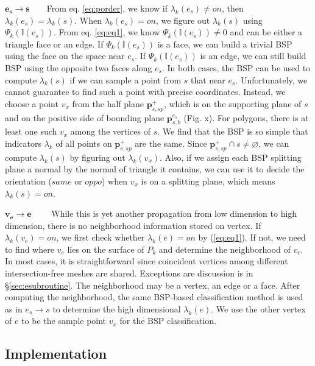 \documentclass[10pt,journal,compsoc]{IEEEtran}
\begin{document}
\vspace{0.5em}
\noindent\textbf{$\bm{e_s\to s}$}~~~~From eq. \ref{eq:porder}, we know if $\lambda_k(e_s) \neq on$, then $\lambda_k(e_s)=\lambda_k(s)$. When $\lambda_k(e_s) = on$, we figure out $\lambda_k(s)$ using $\Psi_k(\mathbb{I}(e_s))$. From eq. \ref{eq:eq1}, we know $\Psi_k(\mathbb{I}(e_s)) \neq 0$ and can be either a triangle face or an edge. If $\Psi_k(\mathbb{I}(e_s))$ is a face, we can build a trivial BSP \cite{thibault1987set} using the face on the space near $e_s$. If $\Psi_k(\mathbb{I}(e_s))$ is an edge, we can still build BSP using the opposite two faces along $e_s$. In both cases, the BSP can be used to compute $\lambda_k(s)$ if we can sample a point from $s$ that near $e_s$. Unfortunately, we cannot guarantee to find such a point with precise coordinates. Instead, we choose a point $v_x$ from the half plane $\bm{p}_{s, sp}^+$, which is on the supporting plane of $s$ and on the positive side of bounding plane $\bm{p}_{s, b}^{e_s}$ (Fig. x). For polygons, there is at least one such $v_x$ among the vertices of $s$. We find that the BSP is so simple that indicators $\lambda_k$ of all points on $\bm{p}_{s, sp}^+$ are the same. Since $\bm{p}_{s, sp}^+ \cap s \neq \varnothing$, we can compute $\lambda_k(s)$ by figuring out $\lambda_k(v_x)$. Also, if we assign each BSP splitting plane a normal by the normal of triangle it contains, we can use it to decide the orientation ($same$ or $oppo$) when $v_x$ is on a splitting plane, which means $\lambda_k(s)=on$.

\vspace{0.5em}
\noindent\textbf{$\bm{v_e\to e}$}~~~~ While this is yet another propagation from low dimension to high dimension, there is no neighborhood information stored on vertex. If $\lambda_k(v_e)=on$, we first check whether $\lambda_k(e) = on$ by (\ref{eq:eq1}). If not, we need to find where $v_e$ lies on the surface of $P_k$ and determine the neighborhood of $v_e$. In most cases, it is straightforward since coincident vertices among different intersection-free meshes are shared. Exceptions are discussion is in \S\ref{sec:esubroutine}. The neighborhood may be a vertex, an edge or a face. After computing the neighborhood, the same BSP-based classification method is used as in ${e_s\to s}$ to determine the high dimensional $\lambda_k(e)$. We use the other vertex of $e$ to be the sample point $v_x$ for the BSP classification.


\iffalse
\subsection{Implementation}
\end{document}
